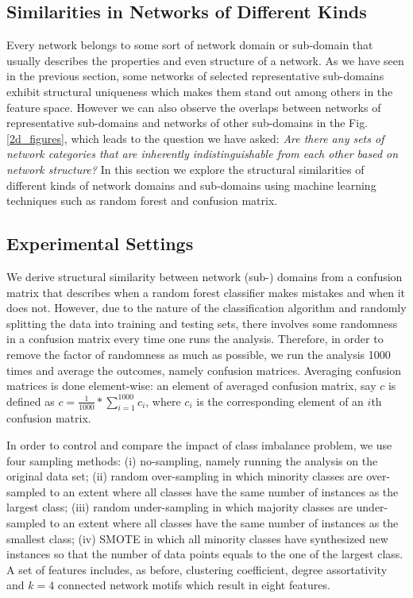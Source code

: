 \subsection*{Similarities in Networks of Different Kinds}
Every network belongs to some sort of network domain or sub-domain that usually describes the properties and even structure of a network. As we have seen in the previous section, some networks of selected representative sub-domains exhibit structural uniqueness which makes them stand out among others in the feature space. However we can also observe the overlaps between networks of representative sub-domains and networks of other sub-domains in the Fig. \ref{2d_figures}, which leads to the question we have asked:  \textit{Are there any sets of network categories that are inherently indistinguishable from each other based on network structure?} In this section we explore the structural similarities of different kinds of network domains and sub-domains using machine learning techniques such as random forest and confusion matrix.  

\subsection{Experimental Settings}
We derive structural similarity between network (sub-) domains from a confusion matrix that describes when a random forest classifier makes mistakes and when it does not. However, due to the nature of the classification algorithm and randomly splitting the data into training and testing sets, there involves some randomness in a confusion matrix every time one runs the analysis. Therefore, in order to remove the factor of randomness as much as possible, we run the analysis 1000 times and average the outcomes, namely confusion matrices. Averaging confusion matrices is done element-wise: an element of averaged confusion matrix, say $c$ is defined as $c = \frac{1}{1000}*\sum_{i=1}^{1000} c_i$, where $c_i$ is the corresponding element of an $i$th confusion matrix.

In order to control and compare the impact of class imbalance problem, we use four sampling methods: (i) no-sampling, namely running the analysis on the original data set; (ii) random over-sampling in which minority classes are over-sampled to an extent where all classes have the same number of instances as the largest class; (iii) random under-sampling in which majority classes are under-sampled to an extent where all classes have the same number of instances as the smallest class; (iv) SMOTE in which all minority classes have synthesized new instances so that the number of data points equals to the one of the largest class. A set of features includes, as before, clustering coefficient, degree assortativity and $k = 4$ connected network motifs which result in eight features.
 
